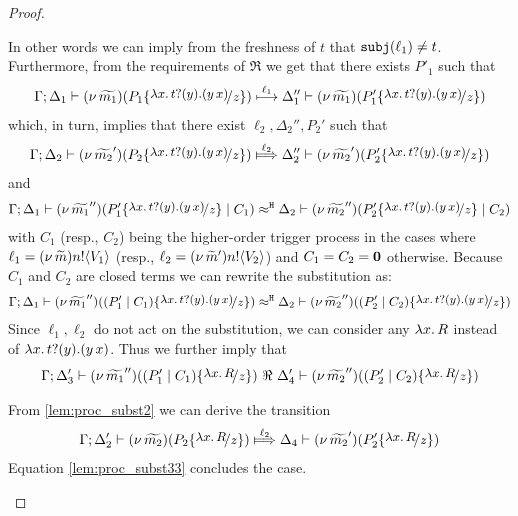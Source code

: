 \begin{proof}
\begin{enumerate}
				In other words we can imply from the freshness of $t$ that $\mathtt{subj}(\ell_1) \not= t$.
				Furthermore, from the requirements of $\Re$
				we get that there exists $P'_1$ such that
				\begin{eqnarray*}
					\horel{\Gamma}{\Delta_1}{\newsp{\widetilde{m_1}}{P_1 \subst{\trvalx{t}}{z} }}
					{\hby{\ell_1}}
					{\Delta_1''}{\newsp{\widetilde{m_1}}{P_1' \subst{\trvalx{t}}{z} }}
				\end{eqnarray*}
				which, in turn, implies that there exist $\ell_2, \Delta_2'', P_2'$ such that
				\begin{eqnarray}
					\horel{\Gamma}{\Delta_2}{\newsp{\widetilde{m_2}'}{P_2 \subst{\trvalx{t}}{z} }}
					{\Hby{\ell_2}}
					{\Delta_2''}{\newsp{\widetilde{m_2}'}{P_2' \subst{\trvalx{t}}{z} }}
					\label{lem:proc_subst0}
				\end{eqnarray}
				and
				\begin{eqnarray*}
					\horel{\Gamma}{\Delta_1}{\newsp{\widetilde{m_1}''}{P_1' \subst{\trvalx{t}}{z} \Par C_1}}
					{\hwb}
					{\Delta_2}{\newsp{\widetilde{m_2}''}{P_2' \subst{\trvalx{t}}{z} \Par C_2}}
				\end{eqnarray*}
				with $C_1$ (resp., $C_2$) being the higher-order trigger process
				in the cases where $\ell_1 = (\nu\, \widetilde{m}) n ! \langle V_1 \rangle$ (resp., $\ell_2 = (\nu\, \widetilde{m}') n ! \langle V_2 \rangle$)
				and $C_1 = C_2 = \mathbf{0}$ otherwise.
				Because $C_1$ and $C_2$ are closed terms we can rewrite the substitution as:
				\begin{eqnarray*}
					\horel{\Gamma}{\Delta_1}{\newsp{\widetilde{m_1}''}{(P_1'\Par C_1) \subst{\trvalx{t}}{z}}}
					{\hwb}
					{\Delta_2}{\newsp{\widetilde{m_2}''}{(P_2'\Par C_2) \subst{\trvalx{t}}{z}}}
				\end{eqnarray*}
				Since $\ell_1, \ell_2$ do not act on the substitution,
				we can consider any $\lambda x.\,R$ instead of $\lambda x.\,t ? (y) . (y\, {x})$.
				Thus we further imply that
				\begin{eqnarray}
					\horel{\Gamma}{\Delta_3'}{\newsp{\widetilde{m_1}''}{(P_1'\Par C_1) \subst{{\abs{x}{R}}}{z}}}
					{\ \Re\ }
					{\Delta_4'}{\newsp{\widetilde{m_2}''}{(P_2'\Par C_2) \subst{{\abs{x}{R}}}{z}}}
					\label{lem:proc_subst33}
				\end{eqnarray}

				From \eqref{lem:proc_subst2} we can derive the transition
				\begin{eqnarray*}
					\horel{\Gamma}{\Delta_2'}{\newsp{\widetilde{m_2}}{P_2 \subst{{\abs{x}{R}}}{z} }}
					{\Hby{\ell_2}}
					{\Delta_4}{\newsp{\widetilde{m_2}'}{P_2' \subst{{\abs{x}{R}}}{z} }}
				\end{eqnarray*}
				Equation \eqref{lem:proc_subst33} concludes the case.



\end{enumerate}
\end{proof}
